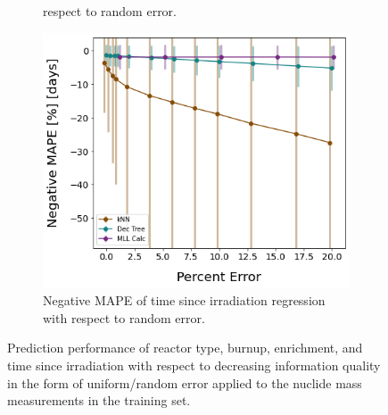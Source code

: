 \begin{figure}[!hbt]
\begin{subfigure}[b]{0.49\textwidth}
{                 respect to random error.}
        \label{fig:randerrC}
    \end{subfigure}
    \hfill
    \begin{subfigure}[b]{0.49\textwidth}
        \centering
        \includegraphics[width=\textwidth]{./chapters/exp1/randerr_compare_nuc29_MAPE_cool.png}
        \caption{Negative \gls{MAPE} of time since irradiation regression with 
                 respect to random error.} 
        \label{fig:randerrD}
    \end{subfigure}
    \caption{Prediction performance of reactor type, burnup, enrichment, and 
             time since irradiation with respect to decreasing information
             quality in the form of uniform/random error applied to the nuclide 
             mass measurements in the training set.}
    \label{fig:randerr}
\end{figure}

